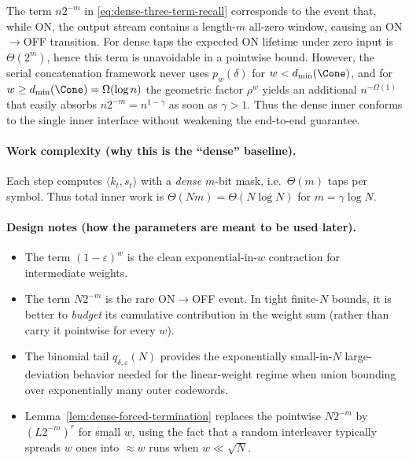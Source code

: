 \begin{remark}
\label{rem:dense-off-harmless}
The term $n2^{-m}$ in \eqref{eq:dense-three-term-recall} corresponds to the event that, while ON, the output stream
contains a length-$m$ all-zero window, causing an ON$\to$OFF transition.
For dense taps the expected ON lifetime under zero input is $\Theta(2^m)$, hence this term is unavoidable in a pointwise bound.
However, the serial concatenation framework never uses $p_w(\delta)$ for $w<d_{\min}(\Cone)$,
and for $w\ge d_{\min}(\Cone)=\Omega(\log n)$ the geometric factor $\rho^w$ yields an additional $n^{-\Omega(1)}$
that easily absorbs $n2^{-m}=n^{1-\gamma}$ as soon as $\gamma>1$.
Thus the dense inner conforms to the single inner interface without weakening the end-to-end guarantee.
\end{remark}




\paragraph{Work complexity (why this is the ``dense'' baseline).}
Each step computes $\langle k_t,s_t\rangle$ with a \emph{dense} $m$-bit mask, i.e.\ $\Theta(m)$ taps per symbol.
Thus total inner work is $\Theta(Nm)=\Theta(N\log N)$ for $m=\gamma\log N$.

\paragraph{Design notes (how the parameters are meant to be used later).}
\begin{itemize}
\item The term $(1-\varepsilon)^w$ is the clean exponential-in-$w$ contraction for intermediate weights.
\item The term $N2^{-m}$ is the rare ON$\to$OFF event. In tight finite-$N$ bounds, it is better to \emph{budget}
its cumulative contribution in the weight sum (rather than carry it pointwise for every $w$).
\item The binomial tail $q_{\delta,\varepsilon}(N)$ provides the exponentially small-in-$N$ large-deviation behavior
needed for the linear-weight regime when union bounding over exponentially many outer codewords.
\item Lemma~\ref{lem:dense-forced-termination} replaces the pointwise $N2^{-m}$ by $(L2^{-m})^r$ for small $w$,
using the fact that a random interleaver typically spreads $w$ ones into $\approx w$ runs when $w\ll \sqrt N$.
\end{itemize}

